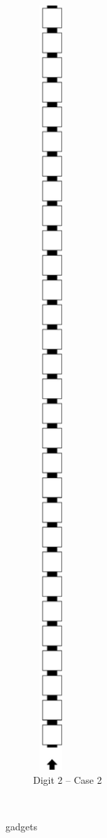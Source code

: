 \begin{itemize}
\begin{figure}[H]
\begin{subfigure}[t]{0.24\textwidth}
                \includegraphics[width=0.15\textwidth]{warping/pre_warp_case2_digit2_msr}
                \caption{\label{fig:pre_warp_case2_digit2_msr} Digit 2 -- Case 2}
            \end{subfigure}%
            ~
            \caption{\label{fig:pre_warp_gadgets} {\prewarp} gadgets }
        \end{figure}



\end{itemize}
